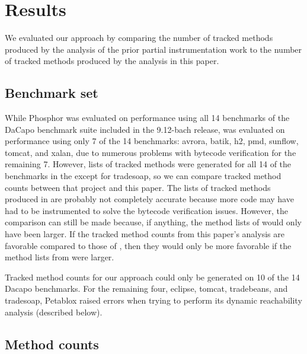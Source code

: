 \chapter{Results}
We evaluated our approach by comparing the number of tracked methods produced by the analysis of the prior partial instrumentation work to the number of tracked methods produced by the analysis in this paper.

\section{Benchmark set}
While Phosphor \cite{phosphor_oopsla} was evaluated on performance using all 14 benchmarks of the  DaCapo benchmark suite \cite{dacapobach} included in the 9.12-bach release, \cite{manoj_project} was evaluated on performance using only 7 of the 14 benchmarks: avrora, batik, h2, pmd, sunflow, tomcat, and xalan, due to numerous problems with bytecode verification for the remaining 7. However, lists of tracked methods were generated for all 14 of the benchmarks in the \cite{manoj_project} except for tradesoap, so we can compare tracked method counts between that project and this paper. The lists of tracked methods produced in \cite{manoj_project} are probably not completely accurate because more code may have had to be instrumented to solve the bytecode verification issues. However, the comparison can still be made because, if anything, the method lists of \cite{manoj_project} would only have been larger. If the tracked method counts from this paper's analysis are favorable compared to those of \cite{manoj_project}, then they would only be more favorable if the method lists from \cite{manoj_project} were larger.

Tracked method counts for our approach could only be generated on 10 of the 14 Dacapo benchmarks. For the remaining four, eclipse, tomcat, tradebeans, and tradesoap, Petablox raised errors when trying to perform its dynamic reachability analysis (described below). 

\section{Method counts}


